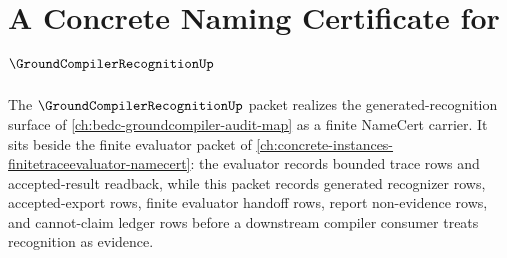 \chapter{A Concrete Naming Certificate for $\GroundCompilerRecognitionUp$}
\label{ch:concrete-instances-groundcompilerrecognition-namecert}

The $\GroundCompilerRecognitionUp$ packet realizes the generated-recognition surface of \autoref{ch:bedc-groundcompiler-audit-map} as a finite NameCert carrier. It sits beside the finite evaluator packet of \autoref{ch:concrete-instances-finitetraceevaluator-namecert}: the evaluator records bounded trace rows and accepted-result readback, while this packet records generated recognizer rows, accepted-export rows, finite evaluator handoff rows, report non-evidence rows, and cannot-claim ledger rows before a downstream compiler consumer treats recognition as evidence.

